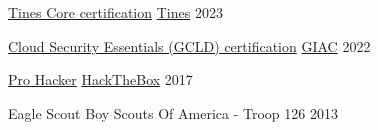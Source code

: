 
\begin{cvhonors}

  \cvhonor
    {\href{https://certification.tines.com/certificate/3FebGM9pnA}{Tines Core certification}}
    {\href{https://www.tines.com/}{Tines}}
    {}
    {2023}

  \cvhonor
    {\href{https://www.credly.com/badges/844480fc-0193-421c-8813-731f345666d6/}{Cloud Security Essentials (GCLD) certification}}
    {\href{https://www.giac.org/}{GIAC}}
    {}
    {2022}

  \cvhonor
    {\href{https://app.hackthebox.com/profile/3716}{Pro Hacker}} %
    {\href{https://www.hackthebox.com/}{HackTheBox}} %
    {} %
    {2017} %

  \cvhonor
    {Eagle Scout} %
    {Boy Scouts Of America - Troop 126} %
    {} %
    {2013} %

\end{cvhonors}